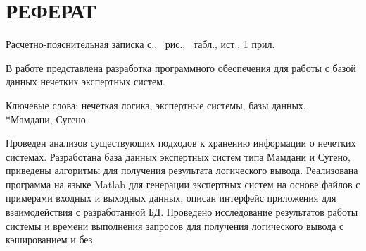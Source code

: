 \section*{РЕФЕРАТ}

Расчетно-пояснительная записка \pageref{LastPage} с., \totalfigures\ рис., \totaltables\ табл.,  ист., 1 прил.

В работе представлена разработка программного обеспечения для работы с базой данных нечетких экспертных систем.

Ключевые слова: нечеткая логика, экспертные системы, базы данных, \\*Мамдани, Сугено.

Проведен анализов существующих подходов к хранению информации о нечетких системах. Разработана база данных экспертных систем типа Мамдани и Сугено, приведены алгоритмы для получения результата логического вывода. Реализована программа на языке Matlab для генерации экспертных систем на основе файлов с примерами входных и выходных данных, описан интерфейс приложения для взаимодействия с разработанной БД. Проведено исследование результатов работы системы и времени выполнения запросов для получения логического вывода с кэшированием и без.
\pagebreak